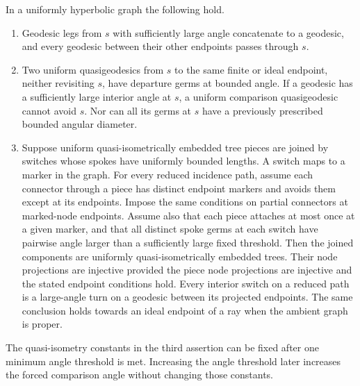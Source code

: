 \begin{lemma}
\label{fan:marker}\label{fan:marker-comparison}
In a uniformly hyperbolic graph the following hold.
\begin{enumerate}[label=\textup{(\roman*)}]
\item Geodesic legs from $s$ with sufficiently large angle concatenate
to a geodesic, and every geodesic between their other endpoints passes
through $s$.
\item Two uniform quasigeodesics from $s$ to the same finite or ideal
endpoint, neither revisiting $s$, have departure germs at bounded
angle.  If a geodesic has a sufficiently large interior angle at $s$,
a uniform comparison quasigeodesic cannot avoid $s$.  Nor can all its
germs at $s$ have a previously prescribed bounded angular diameter.
\item Suppose uniform quasi-isometrically embedded tree pieces are
joined by switches whose spokes have uniformly bounded lengths.
A switch maps to a marker in the graph.  For every reduced incidence
path, assume each connector through a piece has distinct endpoint
markers and avoids them except at its endpoints.  Impose the same
conditions on partial connectors at marked-node endpoints.  Assume
also that each piece attaches at most once at a given marker, and
that all distinct spoke germs at each switch have pairwise angle
larger than a sufficiently large fixed threshold.
Then the joined components are uniformly quasi-isometrically
embedded trees.  Their node projections are injective provided the
piece node projections are injective and the stated endpoint
conditions hold.  Every interior switch on a reduced path is a
large-angle turn on a geodesic between its projected endpoints.
The same conclusion holds towards an ideal endpoint of a ray when
the ambient graph is proper.
\end{enumerate}
The quasi-isometry constants in the third assertion can be fixed after
one minimum angle threshold is met.  Increasing the angle threshold
later increases the forced comparison angle without changing those
constants.
\end{lemma}

